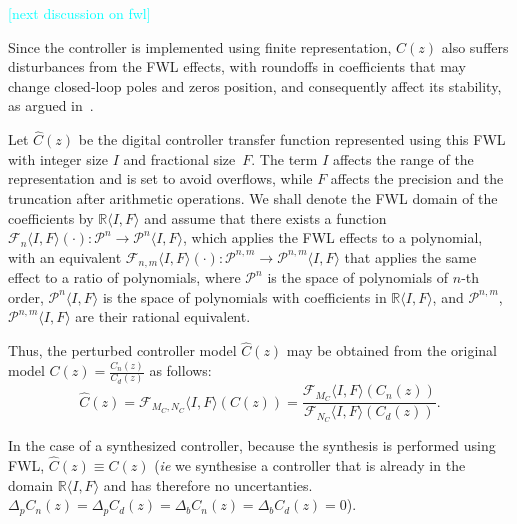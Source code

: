 \documentclass[final]{sig-alternate-05-2015}
\newcommand{\aabatecmt}[1]{}%
\begin{document}
\smallskip

\textcolor{cyan}{[next discussion on fwl]} 

Since the controller is implemented using finite representation, $C(z)$ also suffers
disturbances from the FWL effects, with roundoffs in coefficients that may
change closed-loop poles and zeros position, and consequently affect its
stability, as argued in~\cite{Bessa16}.

Let $\hat{C}(z)$ be the digital controller transfer function represented
using this FWL with integer size $I$ and fractional size~$F$. 
The term $I$ affects the range of the representation and is set to avoid overflows, 
while $F$ affects the precision and the truncation after arithmetic operations. 
We shall denote the FWL domain of the coefficients by $\mathbb{R}\langle I,F
\rangle$
%
%
and assume that there exists a function
$\mathcal{F}_n\langle I,F \rangle(\cdot):\mathcal{P}^{n}\rightarrow \mathcal{P}^{n}\langle I,F \rangle$,
which applies the FWL effects to a polynomial, with an equivalent $\mathcal{F}_{n,m}\langle I,F \rangle(\cdot):\mathcal{P}^{n,m}\rightarrow \mathcal{P}^{n,m}\langle I,F \rangle$ that applies the same effect to a ratio of polynomials, where
$\mathcal{P}^{n}$ is the
space of polynomials of $n$-th order, $\mathcal{P}^{n}\langle I,F
\rangle$ is the space of polynomials with coefficients in
$\mathbb{R}\langle I,F \rangle$, and $\mathcal{P}^{n,m}$,  $\mathcal{P}^{n,m}\langle I,F
\rangle$ are their rational equivalent.

Thus, the perturbed controller model $\hat{C}(z)$ may be obtained from the
original model $C(z)=\frac{C_{n}(z)}{C_{d}(z)}$ as follows:
%
\begin{equation}
\hat{C}(z)=\mathcal{F}_{M_C,N_C}\langle I,F \rangle(C(z))=\frac{\mathcal{F}_{M_C}\langle I,F \rangle(C_n(z))}{\mathcal{F}_{N_C}\langle I,F \rangle(C_d(z))}.
\end{equation}
%
\aabatecmt{[ next statement is potentially quite confusing, especially since you used the hatted variables next. ]}
In the case of a synthesized controller, because the synthesis is performed
using FWL, $\hat{C}(z) \equiv C(z)$ (\emph{ie} we synthesise a controller that is already in the domain $\mathbb{R} \langle I,F \rangle$ and has therefore no uncertanties. $\Delta_pC_n(z)=\Delta_pC_d(z)=\Delta_bC_n(z)=\Delta_bC_d(z)=0$).
\aabatecmt{[discuss relationship with introduced terms $\Delta_b{G}_n(s),\Delta_b{G}_d(s)$?]}
\end{document}
